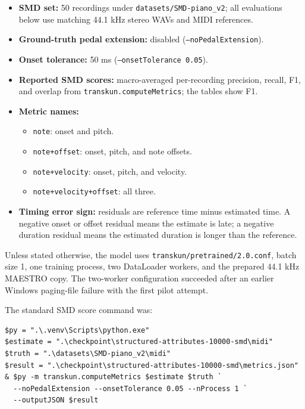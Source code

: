 \documentclass[11pt]{article}
\begin{document}
\begin{itemize}
  \item \textbf{SMD set:} 50 recordings under
        \texttt{datasets/SMD-piano\_v2}; all evaluations below use matching
        44.1 kHz stereo WAVs and MIDI references.
  \item \textbf{Ground-truth pedal extension:} disabled
        (\texttt{--noPedalExtension}).
  \item \textbf{Onset tolerance:} 50 ms
        (\texttt{--onsetTolerance 0.05}).
  \item \textbf{Reported SMD scores:} macro-averaged per-recording
        precision, recall, F1, and overlap from
        \texttt{transkun.computeMetrics}; the tables show F1.
  \item \textbf{Metric names:}
        \begin{itemize}
          \item \texttt{note}: onset and pitch.
          \item \texttt{note+offset}: onset, pitch, and note offsets.
          \item \texttt{note+velocity}: onset, pitch, and velocity.
          \item \texttt{note+velocity+offset}: all three.
        \end{itemize}
  \item \textbf{Timing error sign:} residuals are
        reference time minus estimated time. A negative onset or offset
        residual means the estimate is late; a negative duration residual
        means the estimated duration is longer than the reference.
\end{itemize}

Unless stated otherwise, the model uses
\texttt{transkun/pretrained/2.0.conf}, batch size 1, one training process,
two DataLoader workers, and the prepared 44.1 kHz MAESTRO copy. The two-worker
configuration succeeded after an earlier Windows paging-file failure with
the first pilot attempt.

The standard SMD score command was:

\begin{verbatim}
$py = ".\.venv\Scripts\python.exe"
$estimate = ".\checkpoint\structured-attributes-10000-smd\midi"
$truth = ".\datasets\SMD-piano_v2\midi"
$result = ".\checkpoint\structured-attributes-10000-smd\metrics.json"
& $py -m transkun.computeMetrics $estimate $truth `
  --noPedalExtension --onsetTolerance 0.05 --nProcess 1 `
  --outputJSON $result
\end{verbatim}
\end{document}
